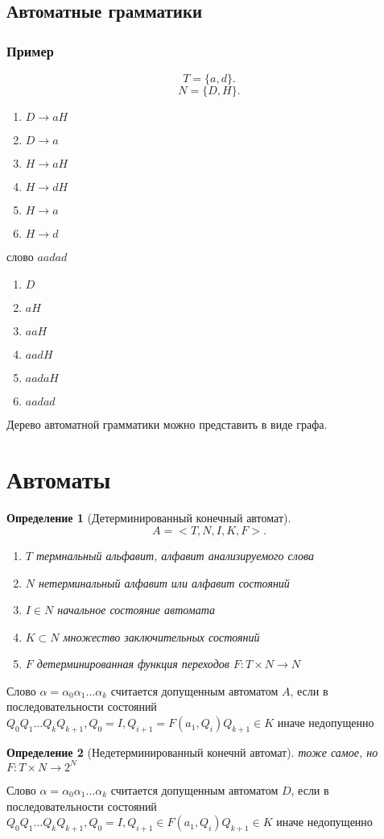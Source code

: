 \documentclass[14pt]{extarticle}
\newtheorem{definition}{Определение}
\begin{document}
\subsection{Автоматные грамматики}
\subsubsection{Пример}
\[
    T = \{a,d\}
.\] 
\[
    N = \{D,H\}
.\] 
\begin{enumerate}
    \item $D \to aH$
    \item $D \to a$
    \item  $H \to aH$
    \item  $H \to dH$
    \item  $H \to a$
    \item  $H \to d$
\end{enumerate}
слово $aadad$
\begin{enumerate}
    \item $D$
    \item  $aH$
    \item  $aaH$
    \item  $aadH$
    \item  $aadaH$
    \item  $aadad$
\end{enumerate}
Дерево автоматной грамматики можно представить в виде графа.
\section{Автоматы}
\begin{definition}[Детерминированный конечный автомат]
    \[
    A = <T,N,I,K,F>
    .\] 
    \begin{enumerate}
        \item $T$ термнальный альфавит, алфавит анализируемого слова
        \item  $N$ нетерминальный алфавит или алфавит состояний
        \item  $I \in N$ начальное состояние автомата
        \item  $K \subset N$ множество заключительных состояний
        \item  $F$ детерминированная функция переходов  $F: T \times N \to N$
    \end{enumerate}
\end{definition}
Слово $\alpha = \alpha_0 \alpha_1 \dots \alpha_{k}$ считается допущенным автоматом $A$,
если в последовательности состояний  $Q_0 Q_1 \dots Q_{k} Q_{k + 1}, Q_0 = I, Q_{i + 1} = F(a_1,Q_{i}) Q_{k + 1} \in K$ иначе недопущенно
\begin{definition}[Недетерминированный конечнй автомат]
    тоже самое, но $F : T \times N \to 2^{N}$
\end{definition}
Слово $\alpha = \alpha_0 \alpha_1 \dots \alpha_{k}$ считается допущенным автоматом $D$,
если в последовательности состояний  $Q_0 Q_1 \dots Q_{k} Q_{k + 1}, Q_0 = I, Q_{i + 1} \in F(a_1,Q_{i}) Q_{k + 1} \in K$ иначе недопущенно
\end{document}
